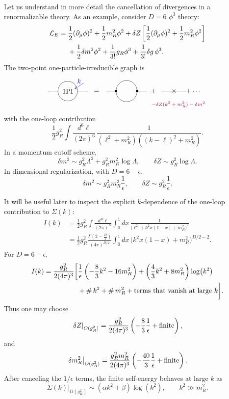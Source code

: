 Let us understand in more detail the cancellation of divergences in a
renormalizable theory.  As an example, consider \(D=6\) \(\phi^3\) theory:
\[
\begin{split}
  {\cal L}_E
  ={}&\frac{1}{2}(\partial_\mu\phi)^2
      +\frac{1}{2}m_R^2\phi^2
      +\delta Z\left[
        \frac{1}{2}(\partial_\mu\phi)^2
        +\frac{1}{2}m_R^2\phi^2
      \right]  \\
   &+\frac{1}{2}\delta m^2\phi^2
      +\frac{1}{3!}g_R\phi^3
      +\frac{1}{3!}\delta g\,\phi^3 .
\end{split}
\]
The two-point one-particle-irreducible graph is
\[
\begin{tikzpicture}[baseline=(eq.base),scale=.9]
  \coordinate (eq) at (0,0);
  \node[draw,circle,minimum size=1.0cm] (ipi) at (-3.1,0) {1PI};
  \draw (-4.25,0)--(ipi.west);
  \draw (ipi.east)--(-1.95,0);
  \draw[->,blue] (-2.2,.45)--(-2.7,.13) node[midway,above] {\(k\)};
  \node at (-1.45,0) {\(=\)};
  \draw (-.9,0)--(-.35,0);
  \draw (.85,0)--(1.4,0);
  \draw (-.35,0) arc (180:0:.6);
  \draw (-.35,0) arc (-180:0:.6);
  \fill (-.35,0) circle (2pt);
  \fill (.85,0) circle (2pt);
  \node at (1.8,0) {\(+\)};
  \draw (2.25,0)--(3.65,0);
  \node at (2.95,0) {\(\times\)};
  \node[purple,align=center,font=\scriptsize] at (3.2,-.75)
    {\(-\delta Z(k^2+m_R^2)-\delta m^2\)};
  \node at (4.05,0) {\(+\cdots\)};
\end{tikzpicture}
\]
with the one-loop contribution
\[
  \frac{1}{2}g_R^2
  \int\frac{d^6\ell}{(2\pi)^6}\,
  \frac{1}{
    (\ell^2+m_R^2)((k-\ell)^2+m_R^2)
  } .
\]
In a momentum cutoff scheme,
\[
  \delta m^2\sim g_R^2\Lambda^2
  +g_R^2m_R^2\log\Lambda,
  \qquad
  \delta Z\sim g_R^2\log\Lambda .
\]
In dimensional regularization, with \(D=6-\epsilon\),
\[
  \delta m^2\sim g_R^2m_R^2\frac{1}{\epsilon},
  \qquad
  \delta Z\sim g_R^2\frac{1}{\epsilon}.
\]

It will be useful later to inspect the explicit \(k\)-dependence of the
one-loop contribution to \(\Sigma(k)\):
\[
\begin{split}
  I(k)
  &=
  \frac{1}{2}g_R^2
  \int\frac{d^D\ell}{(2\pi)^D}\int_0^1 dx\,
  \frac{1}{
    \bigl(\ell^2+k^2x(1-x)+m_R^2\bigr)^2
  }  \\
  &=
  \frac{1}{2}g_R^2
  \frac{\Gamma(2-\frac{D}{2})}{(4\pi)^{D/2}}
  \int_0^1 dx\,
  \bigl(k^2x(1-x)+m_R^2\bigr)^{D/2-2}.
\end{split}
\]
For \(D=6-\epsilon\),
\[
\begin{split}
  I(k)
  =\frac{g_R^2}{2(4\pi)^3}\bigg[
  &\frac{1}{\epsilon}
    \left(-\frac{8}{3}k^2-16m_R^2\right)
   +\left(\frac{4}{3}k^2+8m_R^2\right)\log(k^2)  \\
  &+\#\,k^2+\#\,m_R^2
   +\hbox{terms that vanish at large }k
  \bigg].
\end{split}
\]
Thus one may choose
\[
  \left.\delta Z\right|_{O(g_R^2)}
  =
  \frac{g_R^2}{2(4\pi)^3}
  \left(-\frac{8}{3}\frac{1}{\epsilon}
  +\hbox{finite}\right),
\]
and
\[
  \left.\delta m_R^2\right|_{O(g_R^2)}
  =
  \frac{g_R^2m_R^2}{2(4\pi)^3}
  \left(-\frac{40}{3}\frac{1}{\epsilon}
  +\hbox{finite}\right).
\]
After canceling the \(1/\epsilon\) terms, the finite self-energy behaves at
large \(k\) as
\[
  \left.\Sigma(k)\right|_{O(g_R^2)}
  \sim (\alpha k^2+\beta)\log(k^2),
  \qquad k^2\gg m_R^2 .
\]

